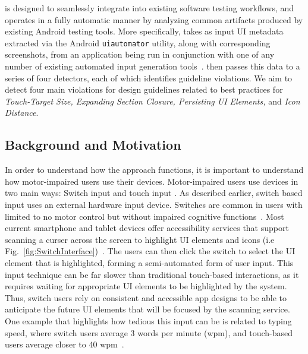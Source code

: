 \MotorEase is designed to seamlessly integrate into existing software testing workflows, and operates in a fully automatic manner by analyzing common artifacts produced by existing Android testing tools. More specifically, \MotorEase takes as input UI metadata extracted via the Android \texttt{\small uiautomator} utility, along with corresponding screenshots, from an application being run in conjunction with one of any number of existing automated input generation tools~\cite{mao2016sapienz,choudhary2015automated,li2017droidbot,ORBITYang,machiry2013dynodroid,Gu:ICSE'19,Moran:ICST'16,crashscope,Su:FSE'17}.
\MotorEase then passes this data to a series of four detectors, each of which identifies guideline violations. We aim to detect four main violations for design guidelines related to best practices for \textit{Touch-Target Size, Expanding Section Closure, Persisting UI Elements,} and \textit{Icon Distance}.

\subsection{Background and Motivation}



\label{sec:motivation}

In order to understand how the \MotorEase approach functions, it is important to understand how motor-impaired users use their devices. Motor-impaired users use devices in two main ways: Switch input and touch input \cite{Zhang13}. As described earlier, switch based input uses an external hardware input device. Switches are common in users with limited to no motor control but without impaired cognitive functions~\cite{Zhang13}. Most current smartphone and tablet devices offer accessibility services that support scanning a curser across the screen to highlight UI elements and icons (i.e Fig.~\ref{fig:SwitchInterface})~\cite{AppleAccess,GoogleAccess}. The users can then click the switch to select the UI element that is highlighted, forming a semi-automated form of user input. 
This input technique can be far slower than traditional touch-based interactions, as it requires waiting for appropriate UI elements to be highlighted by the system. Thus, switch users rely on consistent and accessible app designs to be able to anticipate the future UI elements that will be focused by the scanning service. One example that highlights how tedious this input can be is related to typing speed, where switch users average 3 words per minute (wpm), and touch-based users average closer to 40 wpm~\cite{MacKenzie11}. 


